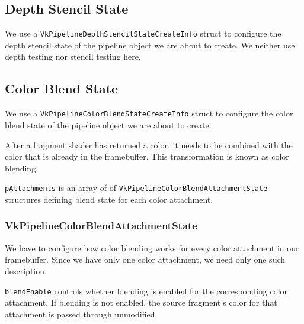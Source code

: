 \subsection{Depth Stencil State}

We use a \texttt{VkPipelineDepthStencilStateCreateInfo} struct to configure
the depth stencil state of the pipeline object we are about to create.
We neither use depth testing nor stencil testing here.

\begin{minipage}{\linewidth}{\noindent}
    
\end{minipage}

\subsection{Color Blend State}

We use a \texttt{VkPipelineColorBlendStateCreateInfo} struct to configure
the color blend state of the pipeline object we are about to create.

After a fragment shader has returned a color,
it needs to be combined with the color that is already in the framebuffer.
This transformation is known as color blending.

\texttt{pAttachments} is an array of of
\texttt{VkPipelineColorBlendAttachmentState} structures defining blend state for
each color attachment.

\begin{minipage}{\linewidth}{\noindent}
    
\end{minipage}

\subsubsection{VkPipelineColorBlendAttachmentState}

We have to configure how color blending works for every color attachment
in our framebuffer.
Since we have only one color attachment, we need only one such description.

\texttt{blendEnable} controls whether blending is enabled for the corresponding
color attachment.
If blending is not enabled, the source fragment's color for that attachment
is passed through unmodified.

